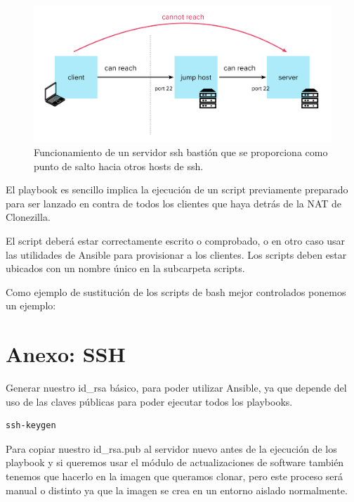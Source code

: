 \begin{figure}[H]
	\centering
	\includegraphics[scale=0.10]{update-clients/bastion.png}
	\caption{Funcionamiento de un servidor ssh bastión que se proporciona como punto de salto hacia otros hosts de ssh.}
\end{figure}

El playbook es sencillo implica la ejecución de un script previamente preparado para ser lanzado en contra de todos los clientes que haya detrás de la NAT de Clonezilla.



El script deberá estar correctamente escrito o comprobado, o en otro caso usar las utilidades de Ansible para provisionar a los clientes. Los scripts deben estar ubicados 
con un nombre único en la subcarpeta scripts.

\newpage
Como ejemplo de sustitución de los scripts de bash mejor controlados ponemos un ejemplo:



\newpage
\section{Anexo: SSH}

Generar nuestro id\_rsa básico, para poder utilizar Ansible, ya que depende del uso de las claves públicas para poder ejecutar todos los playbooks.

\begin{lstlisting}[style=mybash]
ssh-keygen
\end{lstlisting}

Para copiar nuestro id\_rsa.pub al servidor nuevo antes de la ejecución de los playbook y si queremos usar el módulo de actualizaciones de software también tenemos que 
hacerlo en la imagen que queramos clonar, pero este proceso será manual o distinto ya que la imagen se crea en un entorno aislado normalmente.

